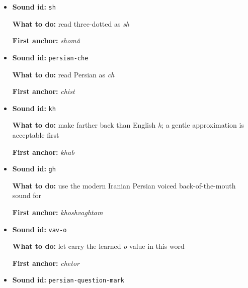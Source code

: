 \begin{itemize}
\begin{minipage}[t]{\linewidth}
  \par \textbf{First anchor:} \textbf{ } \emph{esm-e man}
  \end{minipage}
  \item \begin{minipage}[t]{\linewidth}
  \textbf{Sound id:} \texttt{sh}
  \par \textbf{What to do:} read three-dotted \textbf{} as \emph{sh}
  \par \textbf{First anchor:} \textbf{} \emph{shomâ}
  \end{minipage}
  \item \begin{minipage}[t]{\linewidth}
  \textbf{Sound id:} \texttt{persian-che}
  \par \textbf{What to do:} read Persian \textbf{} as \emph{ch}
  \par \textbf{First anchor:} \textbf{} \emph{chist}
  \end{minipage}
  \item \begin{minipage}[t]{\linewidth}
  \textbf{Sound id:} \texttt{kh}
  \par \textbf{What to do:} make \textbf{} farther back than English \emph{h}; a gentle approximation is acceptable first
  \par \textbf{First anchor:} \textbf{} \emph{khub}
  \end{minipage}
  \item \begin{minipage}[t]{\linewidth}
  \textbf{Sound id:} \texttt{gh}
  \par \textbf{What to do:} use the modern Iranian Persian voiced back-of-the-mouth sound for \textbf{}
  \par \textbf{First anchor:} \textbf{} \emph{khoshvaghtam}
  \end{minipage}
  \item \begin{minipage}[t]{\linewidth}
  \textbf{Sound id:} \texttt{vav-o}
  \par \textbf{What to do:} let \textbf{} carry the learned \emph{o} value in this word
  \par \textbf{First anchor:} \textbf{} \emph{chetor}
  \end{minipage}
  \item \begin{minipage}[t]{\linewidth}
  \textbf{Sound id:} \texttt{persian-question-mark}

\end{minipage}
\end{itemize}
